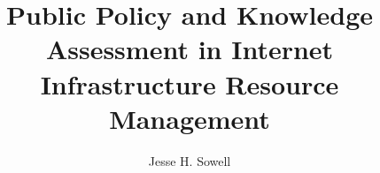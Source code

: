 \documentclass[12pt,journal,compsoc,letterpaper,onecolumn,twoside]{IEEEtran}
\begin{document}
\title{Public Policy and Knowledge Assessment in
  Internet Infrastructure Resource Management} 
\author{Jesse H. Sowell}




\end{document}
